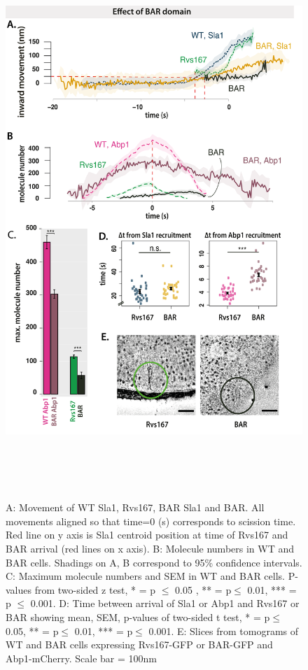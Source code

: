 \begin{figure}[H]
	\centering
	\includegraphics[width=21cm,height=21cm,keepaspectratio]{figures/results_final/delsh3_10}
	\caption [Tracking endocytic proteins in BAR cells]
	{A: Movement of WT Sla1, Rvs167, BAR Sla1 and BAR. All movements aligned so that time=0 (s) corresponds to scission time. Red line on y axis is Sla1 centroid position at time of Rvs167 and BAR arrival (red lines on x axis). 
		B: Molecule numbers in WT and BAR cells. Shadings on A, B correspond to 95\% confidence intervals.
		C: Maximum molecule numbers and SEM in WT and BAR cells. P-values from two-sided z test, * = p $\leq$ 0.05 , ** = p$\leq$ 0.01, *** = p $\leq$ 0.001. 
		D: Time between arrival of Sla1 or Abp1 and Rvs167 or BAR showing mean, SEM, p-values of two-sided t test,  * = p$\leq$ 0.05, ** = p$\leq$ 0.01, *** = p$\leq$ 0.001. 
		E: Slices from tomograms of WT and BAR cells expressing Rvs167-GFP or BAR-GFP and Abp1-mCherry.  Scale bar = 100nm
		\label{fig2_sh3del}}
	
\end{figure}
